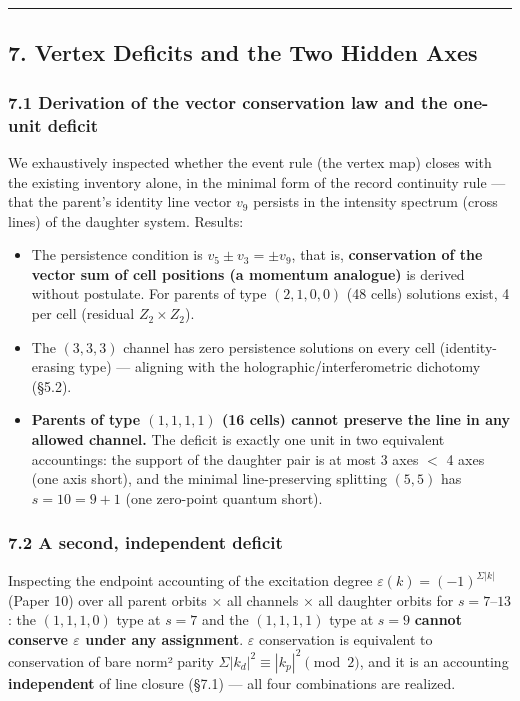 \documentclass[
]{ltjsarticle}
\providecommand{\tightlist}{%
  \setlength{\itemsep}{0pt}\setlength{\parskip}{0pt}}
\begin{document}
\begin{center}\rule{0.5\linewidth}{0.5pt}\end{center}

\subsection{7. Vertex Deficits and the Two Hidden
Axes}\label{vertex-deficits-and-the-two-hidden-axes}

\subsubsection{7.1 Derivation of the vector conservation law and the
one-unit
deficit}\label{derivation-of-the-vector-conservation-law-and-the-one-unit-deficit}

We exhaustively inspected whether the event rule (the vertex map) closes
with the existing inventory alone, in the minimal form of the record
continuity rule --- that the parent's identity line vector \(v_9\)
persists in the intensity spectrum (cross lines) of the daughter system.
Results:

\begin{itemize}
\tightlist
\item
  The persistence condition is \(v_5\pm v_3=\pm v_9\), that is,
  \textbf{conservation of the vector sum of cell positions (a momentum
  analogue)} is derived without postulate. For parents of type
  \((2,1,0,0)\) (48 cells) solutions exist, 4 per cell (residual
  \(Z_2\times Z_2\)).
\item
  The \((3,3,3)\) channel has zero persistence solutions on every cell
  (identity-erasing type) --- aligning with the
  holographic/interferometric dichotomy (§5.2).
\item
  \textbf{Parents of type \((1,1,1,1)\) (16 cells) cannot preserve the
  line in any allowed channel.} The deficit is exactly one unit in two
  equivalent accountings: the support of the daughter pair is at most 3
  axes \(<\) 4 axes (one axis short), and the minimal line-preserving
  splitting \((5,5)\) has \(s=10=9+1\) (one zero-point quantum short).
\end{itemize}

\subsubsection{7.2 A second, independent
deficit}\label{a-second-independent-deficit}

Inspecting the endpoint accounting of the excitation degree
\(\varepsilon(k)=(-1)^{\Sigma|k|}\) (Paper 10) over all parent orbits ×
all channels × all daughter orbits for \(s=7\)--\(13\): the
\((1,1,1,0)\) type at \(s=7\) and the \((1,1,1,1)\) type at \(s=9\)
\textbf{cannot conserve \(\varepsilon\) under any assignment}.
\(\varepsilon\) conservation is equivalent to conservation of bare norm²
parity \(\Sigma|k_d|^2\equiv|k_p|^2\pmod2\), and it is an accounting
\textbf{independent} of line closure (§7.1) --- all four combinations
are realized.
\end{document}
